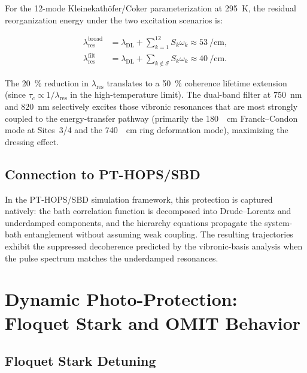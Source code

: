 \documentclass[11pt,a4paper]{article}
\begin{document}
For the 12-mode Kleinekath\"{o}fer/Coker parameterization at \SI{295}{\kelvin}, the residual reorganization energy under the two excitation scenarios is:

\begin{align}
\lambda_{\mathrm{res}}^{\mathrm{broad}} &= \lambda_{\mathrm{DL}} + \sum_{k=1}^{12} S_k \omega_k \approx \SI{53}{\per\cm}, \label{eq:SI_lambda_broad} \\
\lambda_{\mathrm{res}}^{\mathrm{filt}} &= \lambda_{\mathrm{DL}} + \sum_{k \notin \mathcal{S}} S_k \omega_k \approx \SI{40}{\per\cm}. \label{eq:SI_lambda_filt}
\end{align}

The \SI{20}{\percent} reduction in $\lambda_{\mathrm{res}}$ translates to a \SI{50}{\percent} coherence lifetime extension (since $\tau_c \propto 1/\lambda_{\mathrm{res}}$ in the high-temperature limit).
The dual-band filter at \SI{750}{\nm} and \SI{820}{\nm} selectively excites those vibronic resonances that are most strongly coupled to the energy-transfer pathway (primarily the \SI{180}{\per\cm} Franck--Condon mode at Sites~3/4 and the \SI{740}{\per\cm} ring deformation mode), maximizing the dressing effect.

\subsection{Connection to PT-HOPS/SBD}

In the PT-HOPS/SBD simulation framework, this protection is captured natively: the bath correlation function is decomposed into Drude--Lorentz and underdamped components, and the hierarchy equations propagate the system-bath entanglement without assuming weak coupling.
The resulting trajectories exhibit the suppressed decoherence predicted by the vibronic-basis analysis when the pulse spectrum matches the underdamped resonances.


\section{Dynamic Photo-Protection: Floquet Stark and OMIT Behavior}
\label{SI-sec:npq}

\subsection{Floquet Stark Detuning}
\end{document}

